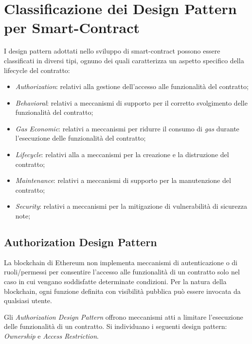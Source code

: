 \chapter{Classificazione dei Design Pattern per Smart-Contract}
I design pattern adottati nello sviluppo di smart-contract possono essere classificati in diversi tipi\cite[alcuni tipi]{9089272}\cite{9050163}, ognuno dei quali caratterizza un aspetto specifico della lifecycle del contratto:

\begin{itemize}
	\item \textit{Authorization}: relativi alla gestione dell'accesso alle funzionalità del contratto;
	\item \textit{Behavioral}: relativi a meccanismi di supporto per il corretto svolgimento delle funzionalità del contratto;
	\item \textit{Gas Economic}: relativi a meccanismi per ridurre il consumo di \textit{gas} durante l'esecuzione delle funzionalità del contratto;
	\item \textit{Lifecycle}: relativi alla a meccanismi per la creazione e la distruzione del contratto;
	\item \textit{Maintenance}: relativi a meccanismi di supporto per la manutenzione del contratto;
	\item \textit{Security}: relativi a meccanismi per la mitigazione di vulnerabilità di sicurezza note;
\end{itemize}

\section{Authorization Design Pattern}
La blockchain di Ethereum non implementa meccanismi di autenticazione o di ruoli/permessi per consentire l'accesso alle funzionalità di un contratto solo nel caso in cui vengano soddisfatte determinate condizioni. Per la natura della blockchain, ogni funzione definita con visibilità pubblica può essere invocata da qualsiasi utente.\par
Gli \textit{Authorization Design Pattern} offrono meccanismi atti a limitare l'esecuzione delle funzionalità di un contratto. Si individuano i seguenti design pattern: \textit{Ownership} e \textit{Access Restriction}.
